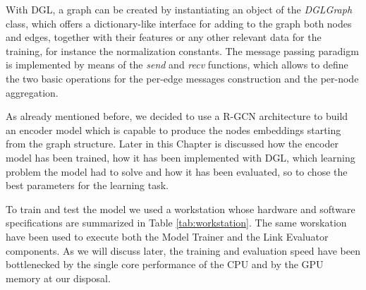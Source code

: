 \documentclass[%
    corpo=13.5pt,
    twoside,
    oldstyle,
    tipotesi=magistrale,
    greek,
    evenboxes
]{toptesi}
\begin{document}
With DGL, a graph can be created by instantiating an object of the
\emph{DGLGraph} class, which offers a dictionary-like interface for adding to
the graph both nodes and edges, together with their features or any other
relevant data for the training, for instance the normalization constants.
The message passing paradigm is implemented by means of the \emph{send} and
\emph{recv} functions, which allows to define the two basic operations for the
per-edge messages construction and the per-node aggregation.

As already mentioned before, we decided to use a R-GCN architecture to build
an encoder model which is capable to produce the nodes embeddings starting
from the graph structure.
Later in this Chapter is discussed how the encoder model has been trained, how
it has been implemented with DGL, which learning problem the model had
to solve and how it has been evaluated, so to chose the best parameters for the
learning task.
\newline

To train and test the model we used a workstation whose hardware and software
specifications are summarized in Table \ref{tab:workstation}.
The same worskation have been used to execute both the Model Trainer and
the Link Evaluator components.
As we will discuss later, the training and evaluation speed have been
bottlenecked by the single core performance of the CPU and by the GPU
memory at our disposal.
\end{document}
